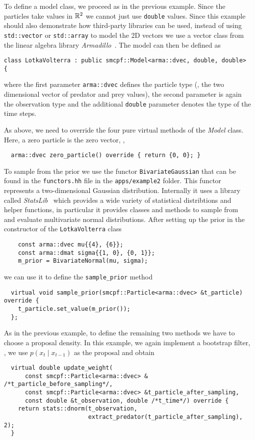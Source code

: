 \begin{example}
  To define a model class, we proceed as in the previous
  example. Since the particles take values in $\mathbb{R}^2$ we cannot just
  use \texttt{double} values. Since this example should also
  demonstrate how third-party libraries can be used, instead of using
  \texttt{std::vector} or \texttt{std::array} to model the 2D vectors
  we use a vector class from the linear algebra library
  \emph{Armadillo}~\cite{armadillo}. The model can then be defined as
\begin{verbatim}
class LotkaVolterra : public smcpf::Model<arma::dvec, double, double> {
\end{verbatim}
  where the first parameter \texttt{arma::dvec} defines the particle
  type (\ie, the two dimensional vector of predator and prey values),
  the second parameter is again the observation type and the
  additional \texttt{double} parameter denotes the type of the time
  steps.

  As above, we need to override the four pure virtual methods of the
  \emph{Model} class. Here, a zero particle is the zero vector, \ie,
\begin{verbatim}
  arma::dvec zero_particle() override { return {0, 0}; }
\end{verbatim}
  To sample from the prior we use the functor
  \texttt{BivariateGaussian} that can be found in the
  \texttt{functors.hh} file in the \texttt{apps/example2} folder. This
  functor represents a two-dimensional Gaussian
  distribution. Internally it uses a library called
  \emph{StatsLib}~\cite{stats} which provides a wide variety of
  statistical distribtions and helper functions, in particular it
  provides classes and methods to sample from and evaluate
  multivariate normal distributions. After setting up the prior in the
  constructor of the \texttt{LotkaVolterra} class
\begin{verbatim}
    const arma::dvec mu{{4}, {6}};
    const arma::dmat sigma{{1, 0}, {0, 1}};
    m_prior = BivariateNormal(mu, sigma);
\end{verbatim}
  we can use it to define the \texttt{sample\_prior} method
\begin{verbatim}
  virtual void sample_prior(smcpf::Particle<arma::dvec> &t_particle) override {
    t_particle.set_value(m_prior());
  };
\end{verbatim}
  As in the previous example, to define the remaining two methods we
  have to choose a proposal density. In this example, we again
  implement a bootstrap filter, \ie, we use $p(x_t \mid x_{t-1})$ as
  the proposal and obtain
\begin{verbatim}
  virtual double update_weight(
      const smcpf::Particle<arma::dvec> & /*t_particle_before_sampling*/,
      const smcpf::Particle<arma::dvec> &t_particle_after_sampling,
      const double &t_observation, double /*t_time*/) override {
    return stats::dnorm(t_observation,
                        extract_predator(t_particle_after_sampling), 2);
  }


\end{verbatim}
\end{example}
